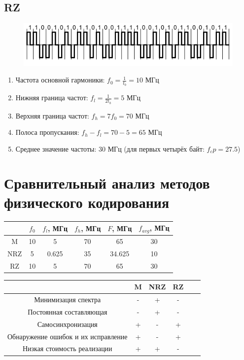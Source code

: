\documentclass[12pt, a4paper] {ncc}
\begin{document}
	\subsection*{RZ}
		\begin{figure}[h!]
			\includegraphics{../img/RZ.png}
		\end{figure}
		\begin{enumerate}
			\item Частота основной гармоники: $f_0 = \frac {1} {t_b} = 10$ МГц
			\item Нижняя граница частот: $f_l = \frac {1} {2t_b}= 5$ МГц
			\item Верхняя граница частот: $f_h = 7f_0 = 70$ МГц
			\item Полоса пропускания: $f_h - f_l = 70 - 5 = 65$ МГц
			\item Среднее значение частоты: $30$ МГц
					(для первых четырёх байт: $f_cp = 27.5$)
		\end{enumerate}
\section*{Сравнительный анализ методов физического кодирования}
    \begin{table}[!h]
        \begin{tabular}{|c|c|c|c|c|c|}
            \hline
                & $f_0$ & $f_l$, МГц & $f_h$, МГц & $F$, МГц & $f_{avg}$, МГц \\ \hline
            M   & 10    & 5          & 70         & 65       &  30      \\ \hline
            NRZ & 5     & 0.625      & 35         & 34.625   &  10       \\ \hline
            RZ  & 10    & 5          & 70         & 65       &  30      \\ \hline
        \end{tabular}
    \end{table}

    \begin{table}[!h]
        \begin{tabular}{|c|c|c|c|c|c|}
            \hline
                                                &  M  & NRZ & RZ \\ \hline
            Минимизация спектра                 &  -  & +   & -  \\ \hline
            Постоянная составляющая             &  -  & +   & -  \\ \hline
            Самосинхронизация                   &  +  & -   & +  \\ \hline
            Обнаружение ошибок и их исправление &  +  & -   & +  \\ \hline
            Низкая стоимость реализации         &  +  & +   & -  \\ \hline
        \end{tabular}
    \end{table}
\end{document}
